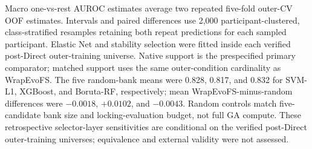 \begin{table}[H]
\begin{minipage}{0.98\linewidth}\scriptsize\vspace{0.4em}
Macro one-vs-rest AUROC estimates average two repeated five-fold outer-CV OOF estimates. Intervals and paired differences use 2,000 participant-clustered, class-stratified resamples retaining both repeat predictions for each sampled participant. Elastic Net and stability selection were fitted inside each verified post-Direct outer-training universe. Native support is the prespecified primary comparator; matched support uses the same outer-condition cardinality as WrapEvoFS. The five random-bank means were 0.828, 0.817, and 0.832 for SVM-L1, XGBoost, and Boruta-RF, respectively; mean WrapEvoFS-minus-random differences were $-0.0018$, $+0.0102$, and $-0.0043$. Random controls match five-candidate bank size and locking-evaluation budget, not full GA compute. These retrospective selector-layer sensitivities are conditional on the verified post-Direct outer-training universes; equivalence and external validity were not assessed.
\end{minipage}
\end{table}
